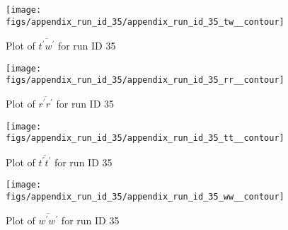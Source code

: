\begin{figure}[H]
\centering
\texttt{[image: figs/appendix\_run\_id\_35/appendix\_run\_id\_35\_tw\_\_contour]}
\caption{Plot of $\overline{t^\prime w^\prime}$ for run ID 35}
\label{fig:appendix_run_id_35_tw__contour}
\end{figure}


\begin{figure}[H]
\centering
\texttt{[image: figs/appendix\_run\_id\_35/appendix\_run\_id\_35\_rr\_\_contour]}
\caption{Plot of $\overline{r^\prime r^\prime}$ for run ID 35}
\label{fig:appendix_run_id_35_rr__contour}
\end{figure}


\begin{figure}[H]
\centering
\texttt{[image: figs/appendix\_run\_id\_35/appendix\_run\_id\_35\_tt\_\_contour]}
\caption{Plot of $\overline{t^\prime t^\prime}$ for run ID 35}
\label{fig:appendix_run_id_35_tt__contour}
\end{figure}


\begin{figure}[H]
\centering
\texttt{[image: figs/appendix\_run\_id\_35/appendix\_run\_id\_35\_ww\_\_contour]}
\caption{Plot of $\overline{w^\prime w^\prime}$ for run ID 35}
\label{fig:appendix_run_id_35_ww__contour}
\end{figure}


